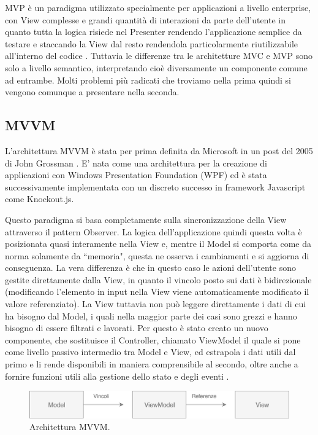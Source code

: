 \noindent
MVP è un paradigma utilizzato specialmente per applicazioni a livello enterprise, con View complesse e grandi quantità di interazioni da parte dell'utente in quanto tutta la logica risiede nel Presenter rendendo l'applicazione semplice da testare e staccando la View dal resto rendendola particolarmente riutilizzabile all'interno del codice \cite{OsmaniOnJSFrameworks}.
Tuttavia le differenze tra le architetture MVC e MVP sono solo a livello semantico, interpretando cioè diversamente un componente comune ad entrambe. Molti problemi più radicati che troviamo nella prima quindi si vengono comunque a presentare nella seconda.

\subsection{MVVM}
L'architettura MVVM è stata per prima definita da Microsoft in un post del 2005 di John Grossman \cite{GossmanOnMVVM}. E' nata come una architettura per la creazione di applicazioni con Windows Presentation Foundation (WPF) ed è stata successivamente implementata con un discreto successo in framework Javascript come Knockout.js.

Questo paradigma si basa completamente sulla sincronizzazione della View attraverso il pattern Observer. La logica dell'applicazione quindi questa volta è posizionata quasi interamente nella View e, mentre il Model si comporta come da norma solamente da “memoria", questa ne osserva i cambiamenti e si aggiorna di conseguenza. La vera differenza è che in questo caso le azioni dell'utente sono gestite direttamente dalla View, in quanto il vincolo posto sui dati è bidirezionale (modificando l'elemento in input nella View viene automaticamente modificato il valore referenziato).
La View tuttavia non può leggere direttamente i dati di cui ha bisogno dal Model, i quali nella maggior parte dei casi sono grezzi e hanno bisogno di essere filtrati e lavorati. Per questo è stato creato un nuovo componente, che sostituisce il Controller, chiamato ViewModel il quale si pone come livello passivo intermedio tra Model e View, ed estrapola i dati utili dal primo e li rende disponibili in maniera comprensibile al secondo, oltre anche a fornire funzioni utili alla gestione dello stato e degli eventi \cite{OsmaniOnJSFrameworks}.

\begin{figure}[h]
\centering 
\vspace*{0.5cm}
\includegraphics[width=13cm]{./images/MVVMworkflow}
\caption{Architettura MVVM.}
\vspace*{0.5cm} 
\end{figure}

